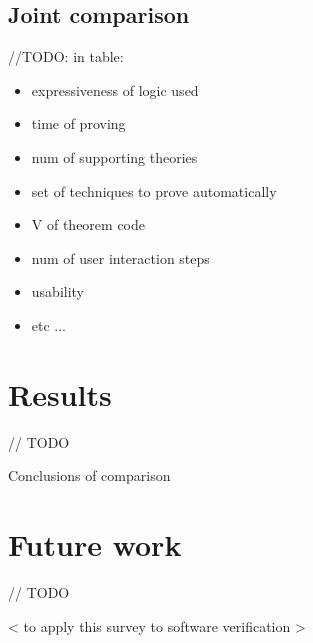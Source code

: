 \documentclass[article]{aaltoseries}
\begin{document}
\subsection{Joint comparison}
\label{sec:joint_comparison}

//TODO: in table:
\begin{itemize}
\itemsep0em
	\item expressiveness of logic used
	\item time of proving
	\item num of supporting theories
	\item set of techniques to prove automatically
	\item V of theorem code
	\item num of user interaction steps
	\item usability
	\item etc ...
\end{itemize}


\section{Results}
\label{sec:results}

// TODO

Conclusions of comparison


\section{Future work}
\label{sec:future_work}

// TODO

< to apply this survey to software verification >






\end{document}

